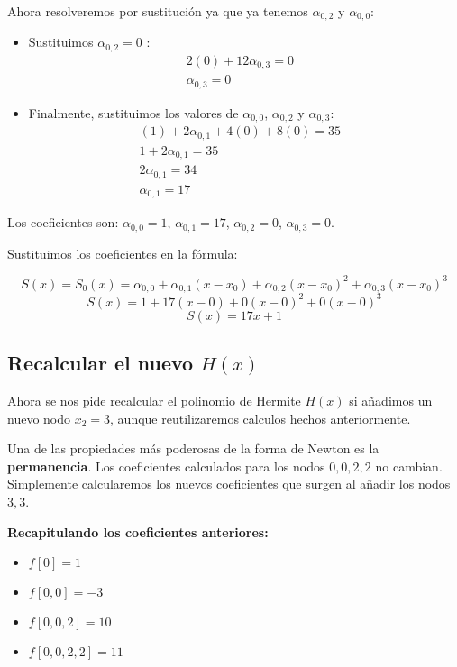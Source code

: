 \documentclass{article}
\begin{document}
Ahora resolveremos por sustitución ya que ya tenemos \(\alpha_{0,2}\) y \(\alpha_{0,0}\):
\begin{itemize}
    \item Sustituimos \(\alpha_{0,2}=0\) :
    \begin{align*}
    &2(0) + 12\alpha_{0,3} = 0 &&\\
    &\alpha_{0,3} = 0 &&
    \end{align*}
    \item Finalmente, sustituimos los valores de \(\alpha_{0,0}\), \(\alpha_{0,2}\) y \(\alpha_{0,3}\):
    \begin{align*}
    &(1) + 2\alpha_{0,1} + 4(0) + 8(0) = 35 &&\\
    &1 + 2\alpha_{0,1} = 35 &&\\
    &2\alpha_{0,1} = 34 &&\\
    &\alpha_{0,1} = 17 &&
    \end{align*}
\end{itemize}
Los coeficientes son: \(\alpha_{0,0} = 1\), \(\alpha_{0,1} = 17\), \(\alpha_{0,2} = 0\), \(\alpha_{0,3} = 0\).

Sustituimos los coeficientes en la fórmula:

$$ S(x) = S_0(x) = \alpha_{0,0} + \alpha_{0,1}(x-x_0) + \alpha_{0,2}(x-x_0)^2 + \alpha_{0,3}(x-x_0)^3 $$
$$ S(x) = 1 + 17(x-0) + 0(x-0)^2 + 0(x-0)^3 $$
$$ \boxed{S(x) = 17x + 1} $$

\subsection{Recalcular el nuevo $H(x)$}

Ahora se nos pide recalcular el polinomio de Hermite $H(x)$ si añadimos un nuevo nodo \(x_2 = 3\), aunque reutilizaremos calculos hechos anteriormente.

Una de las propiedades más poderosas de la forma de Newton es la \textbf{permanencia}. Los coeficientes calculados para los nodos \(0,0,2,2\) no cambian. Simplemente calcularemos los nuevos coeficientes que surgen al añadir los nodos \(3,3\).

\textbf{Recapitulando los coeficientes anteriores:}
\begin{itemize}
    \item \(f[0] = 1\)
    \item \(f[0,0] = -3\)
    \item \(f[0,0,2] = 10\)
    \item \(f[0,0,2,2] = 11\)
\end{itemize}
\end{document}
